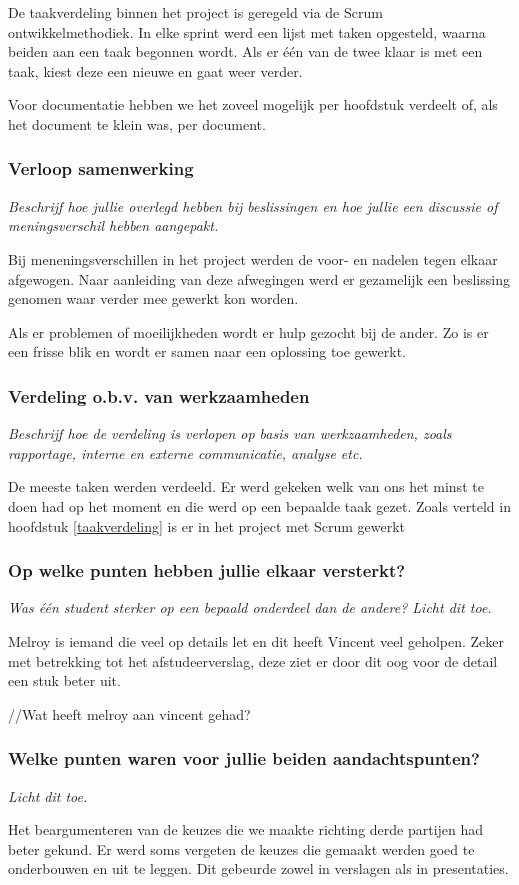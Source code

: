 \documentclass[]{article}
\begin{document}
De taakverdeling binnen het project is geregeld via de Scrum
ontwikkelmethodiek. In elke sprint werd een lijst met taken opgesteld, waarna
beiden aan een taak begonnen wordt. Als er \'e\'en van de twee klaar is met een
taak, kiest deze een nieuwe en gaat weer verder. 

Voor documentatie hebben we het zoveel mogelijk per hoofdstuk verdeelt of, als
het document te klein was, per document.

\subsubsection{Verloop samenwerking}
\textit{Beschrijf hoe jullie overlegd hebben bij beslissingen en hoe jullie een
discussie of meningsverschil hebben aangepakt.}

Bij meneningsverschillen in het project werden de voor- en nadelen tegen elkaar
afgewogen. Naar aanleiding van deze afwegingen werd er gezamelijk een beslissing
genomen waar verder mee gewerkt kon worden.

Als er problemen of moeilijkheden wordt er hulp gezocht bij de ander. Zo is er
een frisse blik en wordt er samen naar een oplossing toe gewerkt.


\subsubsection{Verdeling o.b.v. van werkzaamheden}
\textit{Beschrijf hoe de verdeling is verlopen op basis van werkzaamheden, zoals
rapportage, interne en externe communicatie, analyse etc.}

De meeste taken werden verdeeld. Er werd gekeken welk van ons het minst te doen
had op het moment en die werd op een bepaalde taak gezet. Zoals verteld in
hoofdstuk \ref{taakverdeling} is er in het project met Scrum gewerkt


\subsubsection{Op welke punten hebben jullie elkaar versterkt?}
\textit{Was \'e\'en student sterker op een bepaald onderdeel dan de andere?
Licht dit toe.}

Melroy is iemand die veel op details let en dit heeft Vincent veel geholpen.
Zeker met betrekking tot het afstudeerverslag, deze ziet er door dit oog voor de
detail een stuk beter uit.

//Wat heeft melroy aan vincent gehad?

\subsubsection{Welke punten waren voor jullie beiden aandachtspunten?}
\textit{Licht dit toe.}

Het beargumenteren van de keuzes die we maakte richting derde partijen had beter
gekund. Er werd soms vergeten de keuzes die gemaakt werden goed te onderbouwen
en uit te leggen. Dit gebeurde zowel in verslagen als in presentaties.
\end{document}
